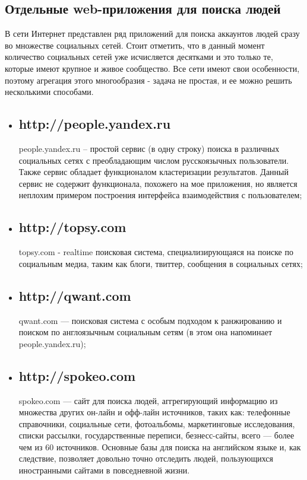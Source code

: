 \begin{chap1}
\subsection{Отдельные web-приложения для поиска людей}
В сети Интернет представлен ряд приложений для поиска аккаунтов людей сразу во множестве социальных сетей. Стоит отметить, что в данный момент количество социальных сетей уже исчисляется десятками и это только те, которые имеют крупное и живое сообщество. Все сети имеют свои особенности,  поэтому агрегация этого многообразия - задача не простая, и ее можно решить несколькими способами.
\begin{itemize}
\item \subsection{http://people.yandex.ru} %
people.yandex.ru – простой сервис (в одну строку) поиска в различных социальных сетях с преобладающим числом  русскоязычных пользователи. Также сервис обладает функционалом кластеризации результатов.  Данный сервис не содержит функционала,  похожего на мое приложения, но является неплохим примером построения интерфейса взаимодействия с пользователем;
\item \subsection{http://topsy.com}
topsy.com - realtime поисковая система, специализирующаяся на поиске по социальным медиа, таким как блоги, твиттер, сообщения в социальных сетях;
\item \subsection{http://qwant.com}
qwant.com — поисковая система с особым подходом к ранжированию и поиском по англоязычным социальным сетям (в этом она напоминает people.yandex.ru);
\item \subsection{http://spokeo.com}
spokeo.com — сайт для поиска людей, аггрегирующий информацию из множества других он-лайн и офф-лайн источников, таких как: телефонные справочники, социальные сети, фотоальбомы, маркетинговые исследования, списки рассылки, государственные переписи, безнесс-сайты, всего — более чем из 60 источников. Основные базы для поиска на английском языке и, как следствие, позволяет довольно точно отследить людей, пользующихся иностранными сайтами в повседневной жизни.
\end{itemize}


\end{chap1}
